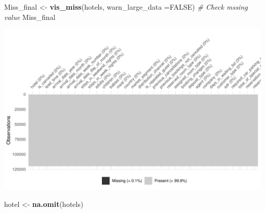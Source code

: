 \documentclass[11pt,a4paper,]{article}
\newenvironment{Shaded}{\begin{snugshade}}{\end{snugshade}}
\newcommand{\CommentTok}[1]{\textcolor[rgb]{0.56,0.35,0.01}{\textit{#1}}}
\newcommand{\DataTypeTok}[1]{\textcolor[rgb]{0.13,0.29,0.53}{#1}}
\newcommand{\KeywordTok}[1]{\textcolor[rgb]{0.13,0.29,0.53}{\textbf{#1}}}
\newcommand{\NormalTok}[1]{#1}
\newcommand{\OtherTok}[1]{\textcolor[rgb]{0.56,0.35,0.01}{#1}}
\newcommand{\StringTok}[1]{\textcolor[rgb]{0.31,0.60,0.02}{#1}}
\begin{document}
\begin{Shaded}
\begin{Highlighting}[]
\NormalTok{Miss_final <-}\StringTok{ }\KeywordTok{vis_miss}\NormalTok{(hotels, }\DataTypeTok{warn_large_data =}\OtherTok{FALSE}\NormalTok{) }\CommentTok{# Check mssing value }
\NormalTok{Miss_final}
\end{Highlighting}
\end{Shaded}

\includegraphics{tidy_files/figure-latex/check NA-1.pdf}

\begin{Shaded}
\begin{Highlighting}[]
\NormalTok{hotel <-}\StringTok{ }\KeywordTok{na.omit}\NormalTok{(hotels)}
\end{Highlighting}
\end{Shaded}
\end{document}
